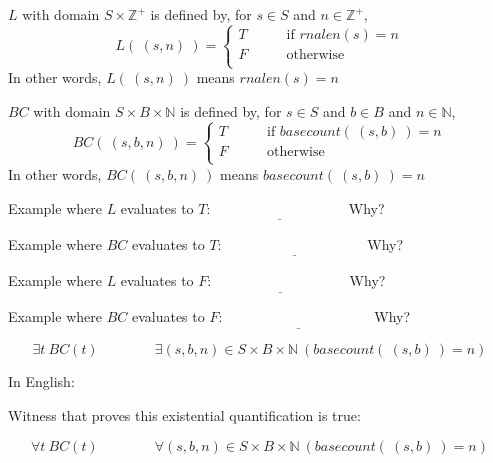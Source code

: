 \documentclass[12pt, oneside]{article}
\newcommand{\A}[0]{\texttt{A}}
\newcommand{\C}[0]{\texttt{C}}
\newcommand{\G}[0]{\texttt{G}}
\newcommand{\U}[0]{\texttt{U}}
\begin{document}
$L$ with domain $S \times \mathbb{Z}^+$ is defined by, for $s \in S$ and $n \in \mathbb{Z}^+$,
\[
L( ~(s, n)~) = \begin{cases}
T &\qquad\text{if $rnalen(s) = n$}\\
F &\qquad\text{otherwise}\\
\end{cases}
\]
In other words, $L(~(s,n)~)$ means $rnalen(s) = n$


\vfill

$BC$ with domain $S \times B \times \mathbb{N}$ is defined by, 
for $s \in S$ and $b \in B$ and $n \in \mathbb{N}$,
\[
BC(~(s, b, n)~) = \begin{cases}
T &\qquad\text{if $basecount(~(s,b)~) = n$}\\
F &\qquad\text{otherwise}\\
\end{cases}
\]
In other words, $BC(~(s,b,n)~)$ means $basecount(~(s,b)~) = n$


\vfill


Example where $L$ evaluates to $T$: $\underline{\phantom{(\A, 1)\hspace{1in}}}$  Why?

\vfill


Example where $BC$ evaluates to $T$: $\underline{\phantom{(\A, \A1)\hspace{1in}}}$  Why?

\vfill


Example where $L$ evaluates to $F$: $\underline{\phantom{(\A, 2)\hspace{1in}}}$ Why?

\vfill


Example where $BC$ evaluates to $F$: $\underline{\phantom{(\A, \C, 1)\hspace{1in}}}$ Why? 

\vfill

\[\exists t ~BC(t) \qquad \qquad 
\exists (s,b,n) \in S \times B \times \mathbb{N}~ (basecount(~(s,b)~) = n)\]

In English: \phantom{There exists an ordered $3$-tuple 
at which the predicate $BC$ evaluates to $T$.}

\vspace{30pt}

Witness that proves this existential quantification is true:\phantom{$(\G\G, \G, 2)$ or $(\G\A\U\G, \G, 2)$)}


\[\forall t ~BC(t) \qquad \qquad 
\forall(s,b,n) \in S \times B \times \mathbb{N} ~(basecount(~(s,b)~) = n)\]
\end{document}
